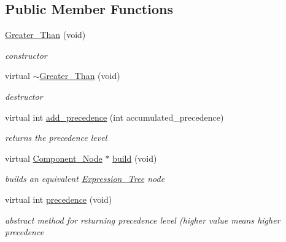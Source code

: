 \subsection*{Public Member Functions}
\begin{DoxyCompactItemize}
\item 
\hyperlink{classMadara_1_1Expression__Tree_1_1Greater__Than_a084adfc44d2cccfe3ec2682eed6ecb08}{Greater\_\-Than} (void)
\begin{DoxyCompactList}\small\item\em constructor \item\end{DoxyCompactList}\item 
virtual \hyperlink{classMadara_1_1Expression__Tree_1_1Greater__Than_a7b95feccc62788b36247855418e3a460}{$\sim$Greater\_\-Than} (void)
\begin{DoxyCompactList}\small\item\em destructor \item\end{DoxyCompactList}\item 
virtual int \hyperlink{classMadara_1_1Expression__Tree_1_1Greater__Than_a1df366cf5aa09a534efbd8233aa8969e}{add\_\-precedence} (int accumulated\_\-precedence)
\begin{DoxyCompactList}\small\item\em returns the precedence level \item\end{DoxyCompactList}\item 
virtual \hyperlink{classMadara_1_1Expression__Tree_1_1Component__Node}{Component\_\-Node} $\ast$ \hyperlink{classMadara_1_1Expression__Tree_1_1Greater__Than_aab05aa3f9ca561e1502e594a206eda6b}{build} (void)
\begin{DoxyCompactList}\small\item\em builds an equivalent \hyperlink{classMadara_1_1Expression__Tree_1_1Expression__Tree}{Expression\_\-Tree} node \item\end{DoxyCompactList}\item 
virtual int \hyperlink{classMadara_1_1Expression__Tree_1_1Symbol_ac060dedb8d16864591b259df375109b3}{precedence} (void)
\begin{DoxyCompactList}\small\item\em abstract method for returning precedence level (higher value means higher precedence \item\end{DoxyCompactList}\end{DoxyCompactItemize}
